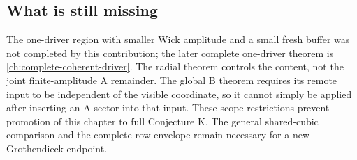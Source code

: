 \subsection{What is still missing}
The one-driver region with smaller Wick amplitude and a small fresh
buffer was not completed by this contribution; the later complete one-driver theorem is \autoref{ch:complete-coherent-driver}.
The radial theorem controls the content, not the joint finite-amplitude
A remainder. The global B theorem requires its remote input to be
independent of the visible coordinate, so it cannot simply be applied
after inserting an A sector into that input. These scope restrictions
prevent promotion of this chapter to full Conjecture K. The general
shared-cubic comparison and the complete row envelope remain necessary
for a new Grothendieck endpoint.
